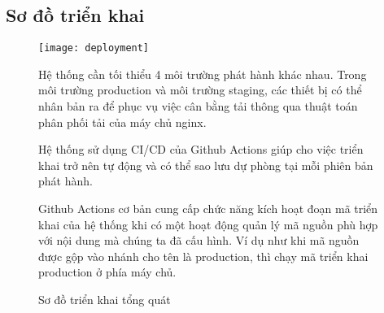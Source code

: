\fontsize{13px}{13px}\selectfont\justifying

\subsection{Sơ đồ triển khai}
\begin{figure}[h!]\fontsize{13px}{13px}\selectfont
\centering
		\texttt{[image: deployment]}
		\caption{Sơ đồ triển khai tổng quát}
\justifying
Hệ thống cần tối thiểu 4 môi trường phát hành khác nhau. Trong môi trường \Gls{production} và môi trường \Gls{staging}, các thiết bị có thể nhân bản ra để phục vụ việc cân bằng tải thông qua thuật toán phân phối tải của máy chủ nginx.

Hệ thống sử dụng CI/CD của Github Actions giúp cho việc triển khai trở nên tự động và có thể sao lưu dự phòng tại mỗi phiên bản phát hành.

Github Actions cơ bản cung cấp chức năng kích hoạt đoạn mã triển khai của hệ thống khi có một hoạt động quản lý mã nguồn phù hợp với nội dung mà chúng ta đã cấu hình. Ví dụ như khi mã nguồn được gộp vào nhánh cho tên là \gls{production}, thì chạy mã triển khai \gls{production} ở phía máy chủ.
\end{figure}
